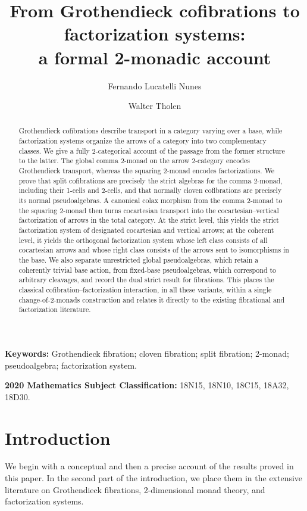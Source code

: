 \documentclass[11pt]{article}
\title{From Grothendieck cofibrations to factorization systems: \\a formal 2-monadic account}
\author[1]{Fernando Lucatelli Nunes}
\author[2]{Walter Tholen}
\affil[1]{CMUC, Department of Mathematics, University of Coimbra,
3000-143 Coimbra, Portugal}
\affil[2]{Department of Mathematics and Statistics, York University,
4700 Keele Street, Toronto, Ontario M3J 1P3, Canada}
\date{}
\theoremstyle{plain}
\theoremstyle{definition}
\theoremstyle{remark}
\numberwithin{equation}{section}
\begin{document}
\maketitle

\begin{abstract}
Grothendieck cofibrations describe transport in a category varying over
a base, while factorization systems organize the arrows of a category
into two complementary classes.  We give a fully 2-categorical account
of the passage from the former structure to the latter.  The global
comma 2-monad on the arrow 2-category encodes Grothendieck transport,
whereas the squaring 2-monad encodes factorizations.  We prove that
split cofibrations are precisely the strict algebras for the comma
2-monad, including their 1-cells and 2-cells, and that normally cloven
cofibrations are precisely its normal pseudoalgebras.  A canonical
colax morphism from the comma 2-monad to the squaring 2-monad then
turns cocartesian transport into the cocartesian--vertical
factorization of arrows in the total category.  At the strict level,
this yields the strict factorization system of designated
cocartesian and vertical arrows; at the coherent level, it yields the
orthogonal factorization system whose left class consists of all
cocartesian arrows and whose right class consists of the arrows sent
to isomorphisms in the base.  We also separate unrestricted global
pseudoalgebras, which retain a coherently trivial base action, from
fixed-base pseudoalgebras, which correspond to arbitrary cleavages,
and record the dual strict result for fibrations.  This places the
classical cofibration--factorization interaction, in all these
variants, within a single change-of-2-monads construction and relates
it directly to the existing fibrational and factorization literature.
\end{abstract}

\noindent\textbf{Keywords:} Grothendieck fibration; cloven
fibration; split fibration; 2-monad; pseudoalgebra; factorization
system.

\medskip
\noindent\textbf{2020 Mathematics Subject Classification:}
18N15, 18N10, 18C15, 18A32, 18D30.

\section{Introduction}

We begin with a conceptual and then a precise account of the results
proved in this paper.  In the second part of the introduction, we place
them in the extensive literature on Grothendieck fibrations,
2-dimensional monad theory, and factorization systems.
\end{document}
